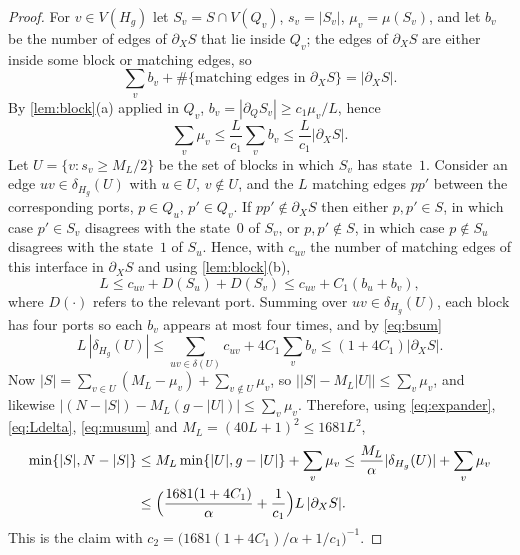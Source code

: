 \documentclass[11pt,a4paper]{article}
\theoremstyle{plain}
\theoremstyle{definition}
\theoremstyle{remark}
\begin{document}
\label{pf:iso}
\lemiso*
\begin{proof}
For $v\in V(H_g)$ let $S_v=S\cap V(Q_v)$, $s_v=|S_v|$, $\mu_v=\mu(S_v)$, and let $b_v$ be the number of edges of $\partial_XS$ that lie inside $Q_v$; the edges of $\partial_XS$ are either inside some block or matching edges, so
\begin{equation}\label{eq:bsum}
 \sum_v b_v+\#\{\text{matching edges in }\partial_XS\}=|\partial_XS|.
\end{equation}
By \cref{lem:block}(a) applied in $Q_v$, $b_v=|\partial_QS_v|\ge c_1\mu_v/L$, hence
\begin{equation}\label{eq:musum}
 \sum_v\mu_v\le\frac{L}{c_1}\sum_vb_v\le\frac{L}{c_1}|\partial_XS|.
\end{equation}
Let $U=\{v:s_v\ge M_L/2\}$ be the set of blocks in which $S_v$ has state~$1$. Consider an edge $uv\in\delta_{H_g}(U)$ with $u\in U$, $v\notin U$, and the $L$ matching edges $pp'$ between the corresponding ports, $p\in Q_u$, $p'\in Q_v$. If $pp'\notin\partial_XS$ then either $p,p'\in S$, in which case $p'\in S_v$ disagrees with the state~$0$ of $S_v$, or $p,p'\notin S$, in which case $p\notin S_u$ disagrees with the state~$1$ of $S_u$. Hence, with $c_{uv}$ the number of matching edges of this interface in $\partial_XS$ and using \cref{lem:block}(b),
\[
 L\le c_{uv}+D(S_u)+D(S_v)\le c_{uv}+C_1(b_u+b_v),
\]
where $D(\cdot)$ refers to the relevant port. Summing over $uv\in\delta_{H_g}(U)$, each block has four ports so each $b_v$ appears at most four times, and by \eqref{eq:bsum}
\begin{equation}\label{eq:Ldelta}
 L\,|\delta_{H_g}(U)|\le\sum_{uv\in\delta(U)}c_{uv}+4C_1\sum_vb_v\le(1+4C_1)|\partial_XS|.
\end{equation}
Now $|S|=\sum_{v\in U}(M_L-\mu_v)+\sum_{v\notin U}\mu_v$, so $\bigl||S|-M_L|U|\bigr|\le\sum_v\mu_v$, and likewise $\bigl|(N-|S|)-M_L(g-|U|)\bigr|\le\sum_v\mu_v$. Therefore, using \eqref{eq:expander}, \eqref{eq:Ldelta}, \eqref{eq:musum} and $M_L=(40L+1)^2\le 1681L^2$,
\begin{align*}
 \min\{|S|,N-|S|\}&\le M_L\min\{|U|,g-|U|\}+\sum_v\mu_v
 \le\frac{M_L}{\alpha}|\delta_{H_g}(U)|+\sum_v\mu_v\\
 &\le\Bigl(\frac{1681(1+4C_1)}{\alpha}+\frac1{c_1}\Bigr)L\,|\partial_XS|.
\end{align*}
This is the claim with $c_2=\bigl(1681(1+4C_1)/\alpha+1/c_1\bigr)^{-1}$.
\end{proof}
\end{document}
